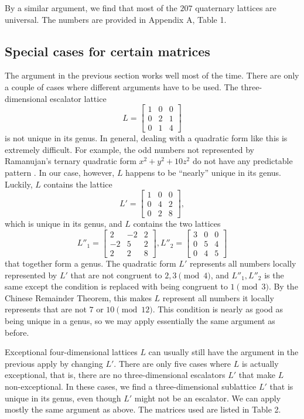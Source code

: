 \documentclass[letterpaper, 12pt]{article}
\begin{document}
By a similar argument, we find that most of the $207$ quaternary lattices are universal. The numbers are provided in Appendix A, Table 1.

\subsection{Special cases for certain matrices}
The argument in the previous section works well most of the time.  There are only a couple of cases where different arguments have to be used. The three-dimensional escalator lattice
\[L = \begin{bmatrix} 1 & 0 & 0 \\ 0 & 2 & 1 \\ 0 & 1 & 4 \end{bmatrix}\]
is not unique in its genus.
In general, dealing with a quadratic form like this is extremely difficult. For example, the odd numbers not represented by Ramanujan's ternary quadratic form $x^2 + y^2 + 10z^2$ do not have any predictable pattern \cite{OnoSoundararajan1997}.
In our case, however, $L$ happens to be ``nearly'' unique in its genus. Luckily, $L$ contains the lattice
\[L' = \begin{bmatrix} 1 & 0 & 0 \\ 0 & 4 & 2 \\ 0 & 2 & 8 \end{bmatrix},\]
which is unique in its genus, and $L$ contains the two lattices
\[L''_1 = \begin{bmatrix} 2 & -2 & 2 \\ -2 & 5 & 2 \\ 2 & 2 & 8 \end{bmatrix}, L''_2 = \begin{bmatrix} 3 & 0 & 0 \\ 0 & 5 & 4 \\ 0 & 4 & 5 \end{bmatrix}\]
that together form a genus. The quadratic form $L'$ represents all numbers locally represented by $L'$ that are not congruent to $2, 3 \pmod 4$, and $L''_1, L''_2$ is the same except the condition is replaced with being congruent to $1 \pmod 3$. By the Chinese Remainder Theorem, this makes $L$ represent all numbers it locally represents that are not $7$ or $10 \pmod{12}$. This condition is nearly as good as being unique in a genus, so we may apply essentially the same argument as before.

Exceptional four-dimensional lattices $L$ can usually still have the argument in the previous apply by changing $L'$. There are only five cases where $L$ is actually exceptional, that is, there are no three-dimensional escalators $L'$ that make $L$ non-exceptional. In these cases, we find a three-dimensional sublattice $L'$ that is unique in its genus, even though $L'$ might not be an escalator. We can apply mostly the same argument as above. The matrices used are listed in Table 2.
\end{document}
